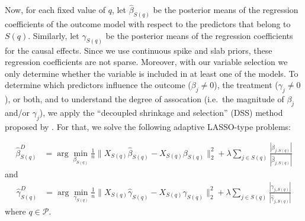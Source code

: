 \documentclass[preprint,12pt]{elsarticle}
\begin{document}
Now, for each fixed value of $q$, let $\hat{\beta}_{S(q)}$ be the posterior means 
of the regression coefficients of the outcome model with respect to
the predictors that belong to $S(q)$. Similarly,
let $\hat{\gamma}_{S(q)}$ be the posterior means of the regression
coefficients for the causal effects. Since we use continuous 
spike and slab priors, these regression coefficients are not sparse.
Moreover, with our variable selection we only determine whether the variable 
is included in at least one of the models.
To determine which predictors
influence the outcome ($\beta_j\neq 0$),
the treatment ($\gamma_j\neq 0$), or both,
and to understand the degree of assocation
(i.e.\ the magnitude of $\beta_j$ and/or $\gamma_j$),
we apply the 
``decoupled shrinkage and selection'' (DSS) method proposed by \citep{hahn2015}. 
For that, we solve the following adaptive LASSO-type \citep{Zou2006}
problems:

\begin{align}
	\hat{\beta}^D_{S(q)} &= 
	\arg\min_{\beta_{S(q)}} \frac{1}{n}\|X_{S(q)}\hat{\beta}_{S(q)}
	- X_{S(q)} \beta_{S(q)}\|_2^2 + \lambda\sum_{j\in S(q)} 
	\frac{|\beta_{j,S(q)}|}{|\hat{\beta}_{j,S(q)}|}
\end{align}
and
\begin{align}
	\hat{\gamma}^D_{S(q)} &= 
	\arg\min_{\gamma_{S(q)}} \frac{1}{n}\|X_{S(q)}\hat{\gamma}_{S(q)}
	- X_{S(q)} \gamma_{S(q)}\|_2^2 + \lambda\sum_{j\in S(q)} 
	\frac{|\gamma_{j,S(q)}|}{|\hat{\gamma}_{j,S(q)}|}
\end{align}
where $q\in \mathcal{P}$.

\end{document}
